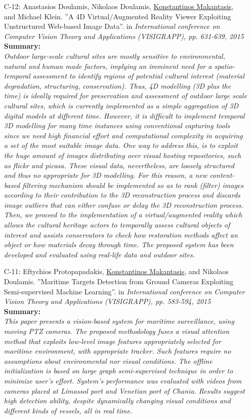 \documentclass[a4paper,10pt]{article}
\begin{document}
\begin{itemize}
	\item [C-12:]Anastasios Doulamis, Nikolaos Doulamis, \underline{Konstantinos Makantasis}, and Michael Klein. ''A 4D Virtual/Augmented Reality Viewer Exploiting Unstructured Web-based Image Data''. in \textit{International conference on Computer Vision Theory and Applications (VISIGRAPP), pp. 631-639, 2015}\\
	\textbf{Summary:}\\
	\textit{Outdoor large-scale cultural sites are mostly sensitive to environmental, natural and human made factors, implying an imminent need for a spatio-temporal assessment to identify regions of potential cultural interest (material degradation, structuring, conservation). Thus, 4D modelling (3D plus the time) is ideally required for preservation and assessment of outdoor large scale cultural sites, which is currently implemented as a simple aggregation of 3D digital models at different time. However, it is difficult to implement temporal 3D modelling for many time instances using conventional capturing tools since we need high financial effort and computational complexity in acquiring a set of the most suitable image data. One way to address this, is to exploit the huge amount of images distributing over visual hosting repositories, such as flickr and picasa. These visual data, nevertheless, are loosely structured and thus no appropriate for 3D modelling. For this reason, a new content-based filtering mechanism should be implemented so as to rank (filter) images according to their contribution to the 3D reconstruction process and discards image outliers that can either confuse or delay the 3D reconstruction process. Then, we proceed to the implementation of a virtual/augmented reality which allows the cultural heritage actors to temporally assess cultural objects of interest and assists conservators to check how restoration methods affect an object or how materials decay through time. The proposed system has been developed and evaluated using real-life data and outdoor sites.}
	
	\item [C-11:]Eftychios Protopapadakis, \underline{Konstantinos Makantasis}, and Nikolaos Doulamis. ''Maritime Targets Detection from Ground Cameras Exploiting Semi-supervised Machine Learning''. in \textit{International conference on Computer Vision Theory and Applications (VISIGRAPP), pp. 583-594, 2015}\\
	\textbf{Summary:}\\
	\textit{This paper presents a vision-based system for maritime surveillance, using moving PTZ cameras. The proposed methodology fuses a visual attention method that exploits low-level image features appropriately selected for maritime environment, with appropriate tracker. Such features require no assumptions about environmental nor visual conditions. The offline initialization is based on large graph semi-supervised technique in order to minimize user's effort. System's performance was evaluated with videos from cameras placed at Limassol port and Venetian port of Chania. Results suggest high detection ability, despite dynamically changing visual conditions and different kinds of vessels, all in real time.}
	

\end{itemize}
\end{document}
